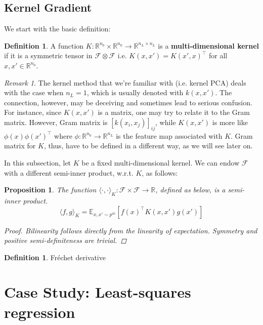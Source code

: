 \documentclass{article}
\theoremstyle{plain}
\newtheorem{proposition}[theorem]{Proposition}
\theoremstyle{definition}
\newtheorem{definition}[theorem]{Definition}
\theoremstyle{remark}
\newtheorem{remark}{Remark}
\begin{document}
\subsection{Kernel Gradient}
We start with the basic definition:
\begin{definition}
	A function $K : \mathbb{R}^{n_0} \times \mathbb{R}^{n_0} \rightarrow \mathbb{R}^{n_L \times n_L}$ is a {\bf multi-dimensional kernel} if it is a symmetric tensor in $\mathcal{F} \otimes \mathcal{F}$ i.e. $K(x, x') = K(x', x)^\intercal$ for all $x, x' \in \mathbb{R}^{n_0}$.
\end{definition}
\begin{remark}
	The kernel method that we're familiar with (i.e. kernel PCA) deals with the case when $n_L = 1$, which is usually denoted with $k(x, x')$.
	The connection, however, may be deceiving and sometimes lead to serious confusion.
	For instance, since $K(x, x')$ is a matrix, one may try to relate it to the Gram matrix.
	However, Gram matrix is $[k(x_i, x_j)]_{ij}$, while $K(x, x')$ is more like $\phi(x) \phi(x')^\intercal$ where $\phi : \mathbb{R}^{n_0} \rightarrow \mathbb{R}^{n_L}$ is the feature map associated with $K$.
	Gram matrix for $K$, thus, have to be defined in a different way, as we will see later on.
\end{remark}

In this subsection, let $K$ be a fixed multi-dimensional kernel.
We can endow $\mathcal{F}$ with a different semi-inner product, w.r.t. $K$, as follows:
\begin{proposition}
	The function $\langle \cdot, \cdot \rangle_K : \mathcal{F} \times \mathcal{F} \rightarrow \mathbb{R}$, defined as below, is a semi-inner product.
	\begin{equation}
		\langle f, g \rangle_K = \mathbb{E}_{x, x' \sim p^{in}} \left[ f(x)^\intercal K(x, x') g(x') \right]
	\end{equation}
	\begin{proof}
		Bilinearity follows directly from the linearity of expectation.
		Symmetry and positive semi-definiteness are trivial.
	\end{proof}
\end{proposition}



\begin{definition}
	Fr\'{e}chet derivative
\end{definition}


\section{Case Study: Least-squares regression}


\newpage
%

\end{document}
